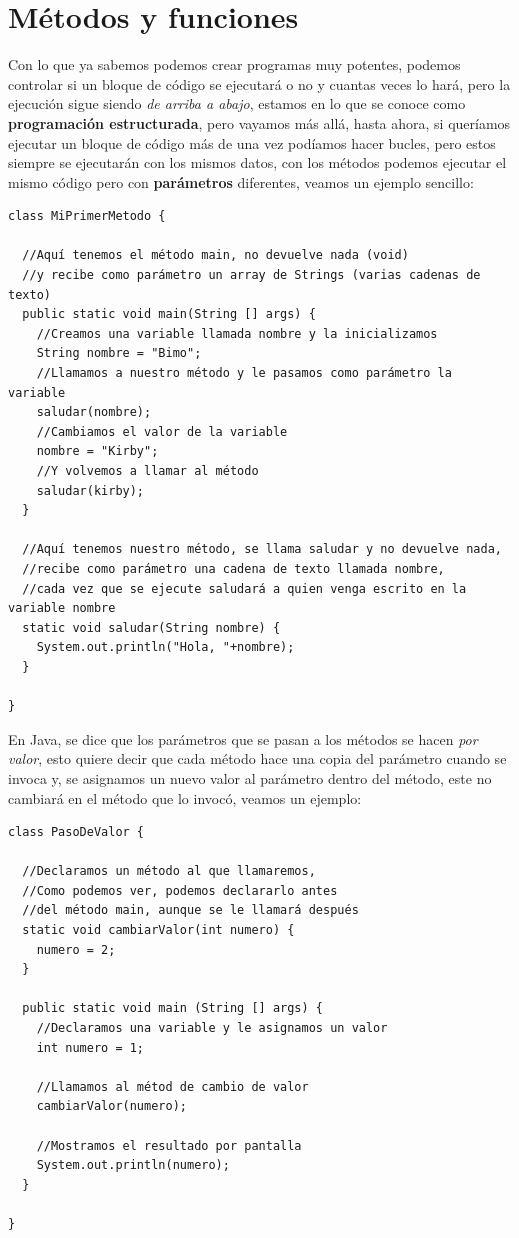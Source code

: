 \documentclass[11pt]{article}
\begin{document}
\section{Métodos y funciones}
\label{sec:org39e6efb}
Con lo que ya sabemos podemos crear programas muy potentes, podemos controlar si un bloque de código se ejecutará o no y cuantas veces lo hará, pero la ejecución sigue siendo \emph{de arriba a abajo}, estamos en lo que se conoce como \textbf{programación estructurada}, pero vayamos más allá, hasta ahora, si queríamos ejecutar un bloque de código más de una vez podíamos hacer bucles, pero estos siempre se ejecutarán con los mismos datos, con los métodos podemos ejecutar el mismo código pero con \textbf{parámetros} diferentes, veamos un ejemplo sencillo:

\begin{verbatim}
class MiPrimerMetodo {

  //Aquí tenemos el método main, no devuelve nada (void)
  //y recibe como parámetro un array de Strings (varias cadenas de texto)
  public static void main(String [] args) {
    //Creamos una variable llamada nombre y la inicializamos
    String nombre = "Bimo";
    //Llamamos a nuestro método y le pasamos como parámetro la variable
    saludar(nombre);
    //Cambiamos el valor de la variable
    nombre = "Kirby";
    //Y volvemos a llamar al método
    saludar(kirby);
  }

  //Aquí tenemos nuestro método, se llama saludar y no devuelve nada,
  //recibe como parámetro una cadena de texto llamada nombre,
  //cada vez que se ejecute saludará a quien venga escrito en la variable nombre
  static void saludar(String nombre) {
    System.out.println("Hola, "+nombre);
  }

}
\end{verbatim}

En Java, se dice que los parámetros que se pasan a los métodos se hacen \emph{por valor}, esto quiere decir que cada método hace una copia del parámetro cuando se invoca y, se asignamos un nuevo valor al parámetro dentro del método, este no cambiará en el método que lo invocó, veamos un ejemplo:

\begin{verbatim}
class PasoDeValor {

  //Declaramos un método al que llamaremos,
  //Como podemos ver, podemos declararlo antes
  //del método main, aunque se le llamará después
  static void cambiarValor(int numero) {
    numero = 2;
  }

  public static void main (String [] args) {
    //Declaramos una variable y le asignamos un valor
    int numero = 1;

    //Llamamos al métod de cambio de valor
    cambiarValor(numero);

    //Mostramos el resultado por pantalla
    System.out.println(numero);
  }

}
\end{verbatim}
\end{document}
